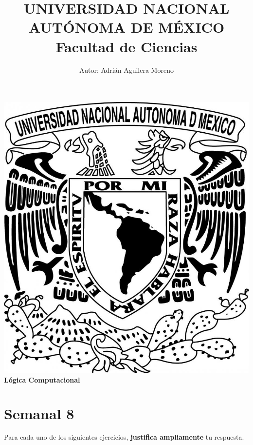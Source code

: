 \documentclass{article}
\begin{document}
\title{UNIVERSIDAD NACIONAL AUT\'ONOMA DE M\'EXICO\\ Facultad de Ciencias}
\author{Autor: Adri\'an Aguilera Moreno}
\date{}
\maketitle
\begin{center}
  \includegraphics[scale=0.20]{../Imagen/Portada.jpg}\\[0.4cm]
  \Large
  \bf{Lógica Computacional}
  \normalsize
\end{center}
\newpage
{}
\section*{\LARGE{Semanal 8}}
Para cada uno de los siguientes ejercicios, \textbf{justifica ampliamente} tu respuesta.
\\
\end{document}
